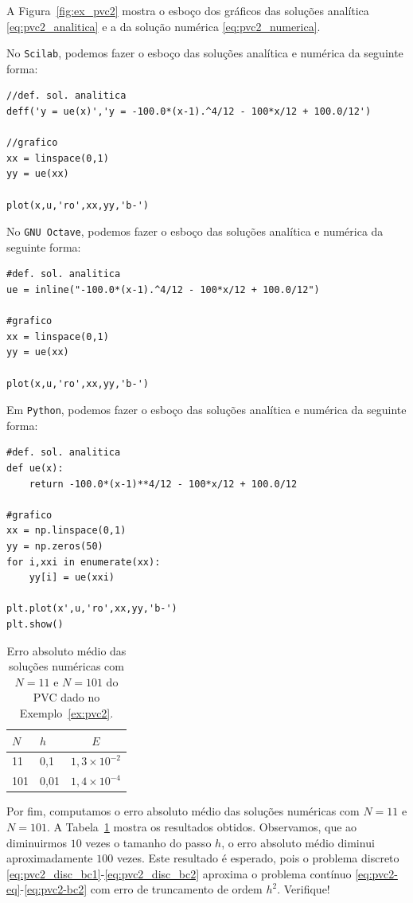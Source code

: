 \begin{sol}
A Figura~\ref{fig:ex_pvc2} mostra o esboço dos gráficos das soluções analítica \eqref{eq:pvc2_analitica} e a da solução numérica \eqref{eq:pvc2_numerica}.

\ifisscilab
No \verb+Scilab+, podemos fazer o esboço das soluções analítica e numérica da seguinte forma:
\begin{verbatim}
//def. sol. analitica
deff('y = ue(x)','y = -100.0*(x-1).^4/12 - 100*x/12 + 100.0/12')

//grafico
xx = linspace(0,1)
yy = ue(xx)

plot(x,u,'ro',xx,yy,'b-')
\end{verbatim}
\fi
\ifisoctave
No \verb+GNU Octave+, podemos fazer o esboço das soluções analítica e numérica da seguinte forma:
\begin{verbatim}
#def. sol. analitica
ue = inline("-100.0*(x-1).^4/12 - 100*x/12 + 100.0/12")

#grafico
xx = linspace(0,1)
yy = ue(xx)

plot(x,u,'ro',xx,yy,'b-')
\end{verbatim}
\fi
\ifispython
Em \verb+Python+, podemos fazer o esboço das soluções analítica e numérica da seguinte forma:
\begin{verbatim}
#def. sol. analitica
def ue(x):
    return -100.0*(x-1)**4/12 - 100*x/12 + 100.0/12

#grafico
xx = np.linspace(0,1)
yy = np.zeros(50)
for i,xxi in enumerate(xx):
    yy[i] = ue(xxi)

plt.plot(x',u,'ro',xx,yy,'b-')
plt.show()
\end{verbatim}
\fi

\begin{table}
  \centering
  \caption{Erro absoluto médio das soluções numéricas com $N=11$ e $N=101$ do PVC dado no Exemplo~\ref{ex:pvc2}.}
  \begin{tabular}{ll|c}
    $N$ & $h$ & $E$\\\hline
    11 & 0,1 & $1,3\times 10^{-2}$\\
    101 & 0,01 & $1,4\times 10^{-4}$
  \end{tabular}
  \label{tab:pvc2_erro}
\end{table}

Por fim, computamos o erro absoluto médio das soluções numéricas com $N=11$ e $N=101$. A Tabela~\ref{tab:pvc2_erro} mostra os resultados obtidos. Observamos, que ao diminuirmos $10$ vezes o tamanho do passo $h$, o erro absoluto médio diminui aproximadamente $100$ vezes. Este resultado é esperado, pois o problema discreto \eqref{eq:pvc2_disc_bc1}-\eqref{eq:pvc2_disc_bc2} aproxima o problema contínuo \eqref{eq:pvc2-eq}-\eqref{eq:pvc2-bc2} com erro de truncamento de ordem $h^2$. Verifique!


\end{sol}
